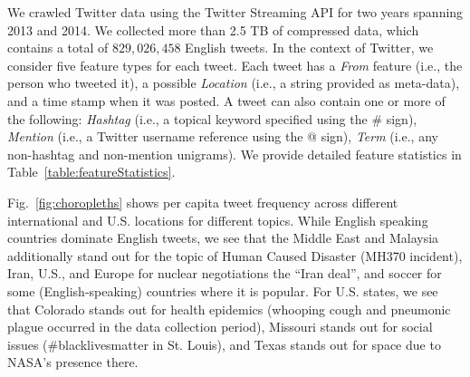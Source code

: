 \documentclass[letterpaper]{article}
\begin{document}
We crawled Twitter data using the Twitter 
Streaming API for two years spanning 2013 and 2014.
We collected more than 2.5 TB of compressed data, which contains a total  
of $829,026,458$ English tweets. In the context 
of Twitter, we consider five feature types for each tweet.  Each
tweet has a \textit{From} feature (i.e., the person who tweeted it), a
possible \textit{Location} (i.e., a string provided as meta-data), and
a time stamp when it was posted.  A tweet can also contain one or more
of the following:
\textit{Hashtag} (i.e., a topical keyword specified using the \# sign), 
\textit{Mention} (i.e., a Twitter username reference using the @ sign), %
\textit{Term} (i.e., any non-hashtag and non-mention unigrams). %
We provide detailed feature statistics in Table~\ref{table:featureStatistics}.  

Fig.~\ref{fig:choropleths} shows per capita tweet frequency across
different international and U.S. locations for different topics.
While English speaking countries dominate English tweets, we see that
the Middle East and Malaysia additionally stand out for the topic of
Human Caused Disaster (MH370 incident), Iran, U.S., and Europe for nuclear
negotiations the ``Iran deal'', and soccer for some (English-speaking)
countries where it is popular.  For U.S. states, we see that Colorado
stands out for health epidemics (whooping cough and pneumonic
plague occurred in the data collection period), 
Missouri stands out for social issues (\#blacklivesmatter in
St. Louis), and Texas stands out for space due to NASA's presence
there.
\end{document}
